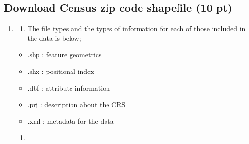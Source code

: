 \documentclass[
  letterpaper,
  DIV=11,
  numbers=noendperiod]{scrartcl}
\providecommand{\tightlist}{%
  \setlength{\itemsep}{0pt}\setlength{\parskip}{0pt}}\usepackage{longtable,booktabs,array}
\begin{document}
\subsection{Download Census zip code shapefile (10
pt)}\label{download-census-zip-code-shapefile-10-pt}

\begin{enumerate}
\def\labelenumi{\arabic{enumi}.}
\item
  \begin{enumerate}
  \def\labelenumii{\alph{enumii}.}
  \tightlist
  \item
    The file types and the types of information for each of those
    included in the data is below;
  \end{enumerate}

  \begin{itemize}
  \item
    .shp : feature geometrics
  \item
    .shx : positional index
  \item
    .dbf : attribute information
  \item
    .prj : description about the CRS
  \item
    .xml : metadata for the data
  \end{itemize}

  \begin{enumerate}
  \def\labelenumii{\alph{enumii}.}
  \setcounter{enumii}{1}
  \tightlist
  \item
  \end{enumerate}
\end{enumerate}
\end{document}
